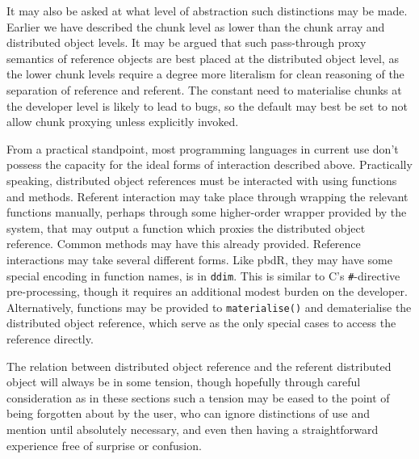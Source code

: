 It may also be asked at what level of abstraction such distinctions may
be made. Earlier we have described the chunk level as lower than the
chunk array and distributed object levels. It may be argued that such
pass-through proxy semantics of reference objects are best placed at the
distributed object level, as the lower chunk levels require a degree
more literalism for clean reasoning of the separation of reference and
referent. The constant need to materialise chunks at the developer level
is likely to lead to bugs, so the default may best be set to not allow
chunk proxying unless explicitly invoked.

From a practical standpoint, most programming languages in current use
don't possess the capacity for the ideal forms of interaction described
above. Practically speaking, distributed object references must be
interacted with using functions and methods. Referent interaction may
take place through wrapping the relevant functions manually, perhaps
through some higher-order wrapper provided by the system, that may
output a function which proxies the distributed object reference. Common
methods may have this already provided. Reference interactions may take
several different forms. Like pbdR, they may have some special encoding
in function names, is in \texttt{ddim}. This is similar to C's
\texttt{\#}-directive pre-processing, though it requires an additional
modest burden on the developer. Alternatively, functions may be provided
to \texttt{materialise()} and dematerialise the distributed object
reference, which serve as the only special cases to access the reference
directly.

The relation between distributed object reference and the referent
distributed object will always be in some tension, though hopefully
through careful consideration as in these sections such a tension may be
eased to the point of being forgotten about by the user, who can ignore
distinctions of use and mention until absolutely necessary, and even
then having a straightforward experience free of surprise or confusion.
